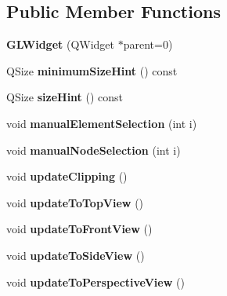 \subsection*{Public Member Functions}
\begin{DoxyCompactItemize}
\item 
\hypertarget{classGLWidget_ab79c391c86de1ffb76f6950b49d82c0c}{}{\bfseries G\+L\+Widget} (Q\+Widget $\ast$parent=0)\label{classGLWidget_ab79c391c86de1ffb76f6950b49d82c0c}

\item 
\hypertarget{classGLWidget_ade3142625c1bfda0576e419b176cf8b1}{}Q\+Size {\bfseries minimum\+Size\+Hint} () const \label{classGLWidget_ade3142625c1bfda0576e419b176cf8b1}

\item 
\hypertarget{classGLWidget_a57698bc426052845b43a135a13540154}{}Q\+Size {\bfseries size\+Hint} () const \label{classGLWidget_a57698bc426052845b43a135a13540154}

\item 
\hypertarget{classGLWidget_ad425870ac081f6814c5bdb794e6e4c21}{}void {\bfseries manual\+Element\+Selection} (int i)\label{classGLWidget_ad425870ac081f6814c5bdb794e6e4c21}

\item 
\hypertarget{classGLWidget_a21f7a00a668f6ab6c5a9b1491e30c43e}{}void {\bfseries manual\+Node\+Selection} (int i)\label{classGLWidget_a21f7a00a668f6ab6c5a9b1491e30c43e}

\item 
\hypertarget{classGLWidget_ad569f9af7f5bbbfee5f1810d07107f20}{}void {\bfseries update\+Clipping} ()\label{classGLWidget_ad569f9af7f5bbbfee5f1810d07107f20}

\item 
\hypertarget{classGLWidget_adf09146230a2acda5a955acf59fbc653}{}void {\bfseries update\+To\+Top\+View} ()\label{classGLWidget_adf09146230a2acda5a955acf59fbc653}

\item 
\hypertarget{classGLWidget_ab4dcb3e931649a5f1edb6c6cede31075}{}void {\bfseries update\+To\+Front\+View} ()\label{classGLWidget_ab4dcb3e931649a5f1edb6c6cede31075}

\item 
\hypertarget{classGLWidget_a4930d77748cd175e349194da489c12d5}{}void {\bfseries update\+To\+Side\+View} ()\label{classGLWidget_a4930d77748cd175e349194da489c12d5}

\item 
\hypertarget{classGLWidget_afa3014a464a473c9ba62b22720f2d6fd}{}void {\bfseries update\+To\+Perspective\+View} ()\label{classGLWidget_afa3014a464a473c9ba62b22720f2d6fd}


\end{DoxyCompactItemize}
